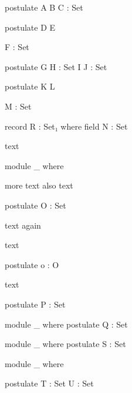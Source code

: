 \documentclass{article}
\begin{document}
\begin{code}
postulate
  A  B
      C : Set
\end{code}

\begin{code}
postulate
  D  E

      F : Set
\end{code}

\begin{code}
postulate
  G  H  : Set
  I
      J : Set
\end{code}

\begin{AgdaMultiCode}
\begin{code}
postulate
  K  L
\end{code}
\begin{code}
      M : Set
\end{code}
\end{AgdaMultiCode}

\begin{code}
record R : Set₁ where
  field N :
            Set
\end{code}


\begin{AgdaAlign}
text \begin{code}        
module _ where
\end{code} more text
    also text  \begin{code}
    postulate O : Set  
  \end{code} text again

 text          \begin{code}            
    postulate o : O    
  \end{code}   text             
\end{AgdaAlign}

\begin{code}
postulate
 P : Set
\end{code}

\begin{code}
module _ where
 postulate
  Q : Set
\end{code}

\begin{code}
module _ where
         postulate
          S : Set
\end{code}

\begin{AgdaMultiCode}
\begin{code}
module _ where
\end{code}
\begin{code}
  postulate T : Set
            U : Set
\end{code}
\end{AgdaMultiCode}
\end{document}
